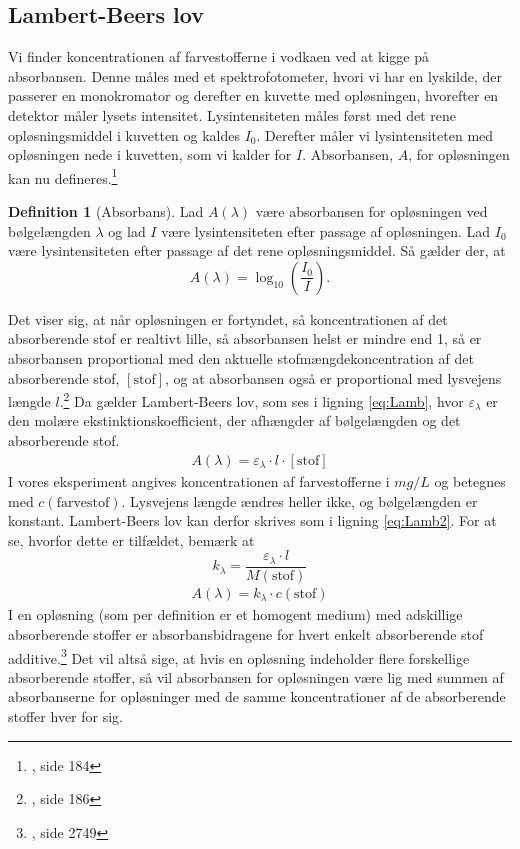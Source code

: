 \documentclass[11pt]{article}
\theoremstyle{definition}
\newtheorem{defi}{Definition}[section]
\begin{document}
\subsection{Lambert-Beers lov}
Vi finder koncentrationen af farvestofferne i vodkaen ved at kigge på absorbansen.
Denne måles med et spektrofotometer, hvori vi har en lyskilde, der passerer en monokromator og derefter en kuvette med opløsningen, hvorefter en detektor måler lysets intensitet. 
Lysintensiteten måles først med det rene opløsningsmiddel i kuvetten og kaldes $I_0$.
Derefter måler vi lysintensiteten med opløsningen nede i kuvetten, som vi kalder for $I$.
Absorbansen, $A$, for opløsningen kan nu defineres.\footnote{\cite{Mygind2022}, side 184}
\begin{defi}[Absorbans]
  Lad $A(\lambda)$ være absorbansen for opløsningen ved bølgelængden $\lambda$ og lad $I$ være lysintensiteten efter passage af opløsningen.
Lad $I_0$ være lysintensiteten efter passage af det rene opløsningsmiddel. 
Så gælder der, at
\[
  A(\lambda)=\log_{10}\left(\frac{I_0}{I}\right).
\] 
\end{defi}
Det viser sig, at når opløsningen er fortyndet, så koncentrationen af det absorberende stof er realtivt lille, så absorbansen helst er mindre end 1, så er absorbansen proportional med den aktuelle stofmængdekoncentration af det absorberende stof, $[\text{stof}]$, og at absorbansen også er proportional med lysvejens længde $l$.\footnote{\cite{Mygind2022}, side 186}
Da gælder Lambert-Beers lov, som ses i ligning \ref{eq:Lamb}, hvor $\varepsilon_{\lambda}$ er den molære ekstinktionskoefficient, der afhængder af bølgelængden og det absorberende stof. 
\begin{equation}
\label{eq:Lamb}
\begin{split}
  A(\lambda)=\varepsilon_{\lambda} \cdot l \cdot [\text{stof}]
\end{split}
\end{equation}
I vores eksperiment angives koncentrationen af farvestofferne i $\unit{mg/L} $ og betegnes med $c(\text{farvestof})$.
Lysvejens længde ændres heller ikke, og bølgelængden er konstant.
Lambert-Beers lov kan derfor skrives som i ligning \ref{eq:Lamb2}.
For at se, hvorfor dette er tilfældet, bemærk at $$k_{\lambda}=\frac{\varepsilon_{\lambda}\cdot l}{M(\text{stof})}$$
\begin{equation}
\label{eq:Lamb2}
\begin{split}
  A(\lambda)=k_{\lambda}\cdot c(\text{stof})
\end{split}
\end{equation}
I en opløsning (som per definition er et homogent medium) med adskillige absorberende stoffer er absorbansbidragene for hvert enkelt absorberende stof additive.\footnote{\cite{Mayerhofer2019}, side 2749}
Det vil altså sige, at hvis en opløsning indeholder flere forskellige absorberende stoffer, så vil absorbansen for opløsningen være lig med summen af absorbanserne for opløsninger med de samme koncentrationer af de absorberende stoffer hver for sig.
\end{document}
